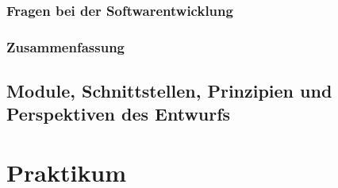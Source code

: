 \documentclass{scrreprt}
\begin{document}
\section{Fragen bei der Softwarentwicklung}
\section{Zusammenfassung}

\chapter{Module, Schnittstellen, Prinzipien und Perspektiven des Entwurfs}


\part{Praktikum}
\setcounter{chapter}{0}

\end{document}
